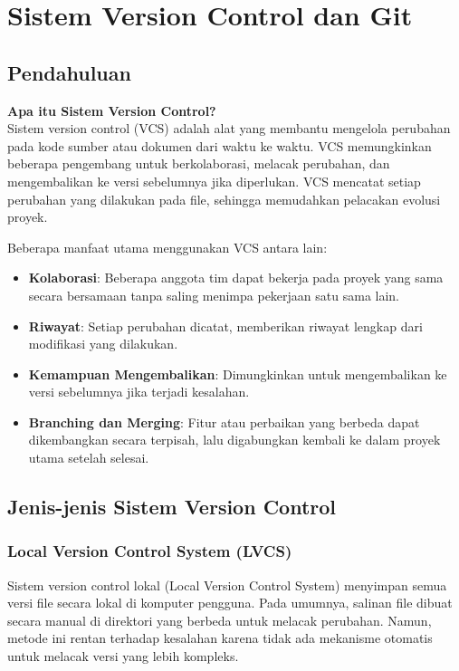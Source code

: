 \chapter{Sistem Version Control dan Git}

\section{Pendahuluan}
\textbf{Apa itu Sistem Version Control?} \\
Sistem version control (VCS) adalah alat yang membantu mengelola perubahan pada kode sumber atau dokumen dari waktu ke waktu. VCS memungkinkan beberapa pengembang untuk berkolaborasi, melacak perubahan, dan mengembalikan ke versi sebelumnya jika diperlukan. VCS mencatat setiap perubahan yang dilakukan pada file, sehingga memudahkan pelacakan evolusi proyek.

Beberapa manfaat utama menggunakan VCS antara lain:
\begin{itemize}
	\item \textbf{Kolaborasi}: Beberapa anggota tim dapat bekerja pada proyek yang sama secara bersamaan tanpa saling menimpa pekerjaan satu sama lain.
	\item \textbf{Riwayat}: Setiap perubahan dicatat, memberikan riwayat lengkap dari modifikasi yang dilakukan.
	\item \textbf{Kemampuan Mengembalikan}: Dimungkinkan untuk mengembalikan ke versi sebelumnya jika terjadi kesalahan.
	\item \textbf{Branching dan Merging}: Fitur atau perbaikan yang berbeda dapat dikembangkan secara terpisah, lalu digabungkan kembali ke dalam proyek utama setelah selesai.
\end{itemize}

\section{Jenis-jenis Sistem Version Control}

\subsection{Local Version Control System (LVCS)}
Sistem version control lokal (Local Version Control System) menyimpan semua versi file secara lokal di komputer pengguna. Pada umumnya, salinan file dibuat secara manual di direktori yang berbeda untuk melacak perubahan. Namun, metode ini rentan terhadap kesalahan karena tidak ada mekanisme otomatis untuk melacak versi yang lebih kompleks.

